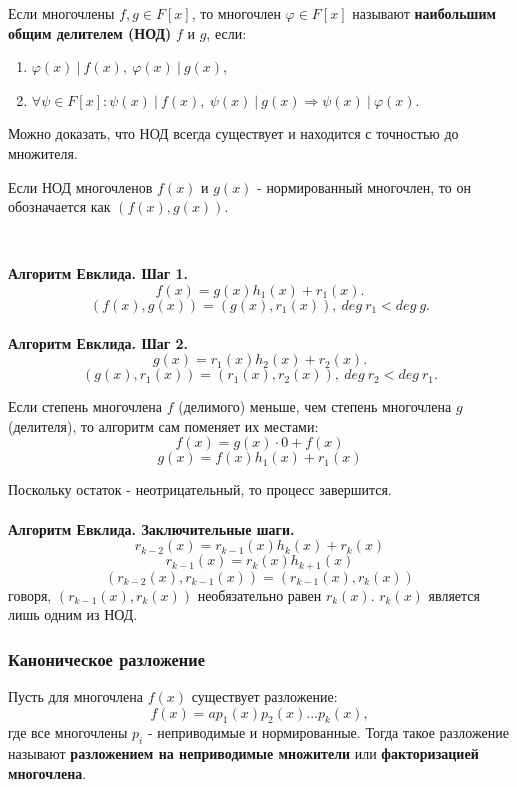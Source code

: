 \documentclass[12pt]{article}
\begin{document}
\begin{defn}
Если многочлены $f, g \in F[x]$, то многочлен $\varphi \in F[x]$ называют \textbf{наибольшим общим делителем (НОД)} $f$ и $g$, если:
\begin{enumerate}
\item $\varphi(x)~|~f(x),~ \varphi(x)~|~g(x)$,
\item $\forall \psi \in F[x]: \psi(x)~|~f(x),~ \psi(x)~|~g(x) \Rightarrow \psi(x)~|~\varphi(x)$.
\end{enumerate}
\end{defn}
Можно доказать, что НОД всегда существует и находится с точностью до множителя. 

\begin{defn}
Если НОД многочленов $f(x)$ и $g(x)$  - нормированный многочлен, то он обозначается как $(f(x), g(x))$.
\end{defn}

~\

\noindent\textbf{Алгоритм Евклида. Шаг 1.} $$f(x) = g(x)h_1(x) + r_1(x).$$
$$(f(x),g(x)) = (g(x), r_1(x)),~deg~r_1 < deg~g.$$
\\
\textbf{Алгоритм Евклида. Шаг 2.} $$g(x) = r_1(x)h_2(x) + r_2(x).$$
$$(g(x),r_1(x)) = (r_1(x), r_2(x)),~deg~r_2 < deg~r_1.$$

Если степень многочлена $f$ (делимого) меньше, чем степень многочлена $g$ (делителя), то алгоритм сам поменяет их местами:
$$f(x) = g(x) \cdot 0 + f(x)$$
$$g(x) = f(x)h_1(x) + r_1(x)$$

Поскольку остаток - неотрицательный, то процесс завершится.\\ \\
\textbf{Алгоритм Евклида. Заключительные шаги.}
$$r_{k-2}(x) = r_{k-1}(x)h_k(x) + r_k(x)$$
$$r_{k-1}(x) = r_k(x)h_{k+1}(x)$$
$$(r_{k-2}(x), r_{k-1}(x)) = (r_{k-1}(x), r_{k}(x))$$
 говоря, $(r_{k-1}(x), r_{k}(x))$ необязательно равен $r_k(x)$. $r_k(x)$ является лишь одним из НОД.

\subsubsection{Каноническое разложение}
\begin{defn}
Пусть для многочлена $f(x)$ существует разложение: $$f(x) = ap_1(x)p_2(x)...p_k(x),$$ где все многочлены $p_i$ - неприводимые и нормированные. Тогда такое разложение называют \textbf{разложением на неприводимые множители} или \textbf{факторизацией многочлена}.
\end{defn}
\end{document}
